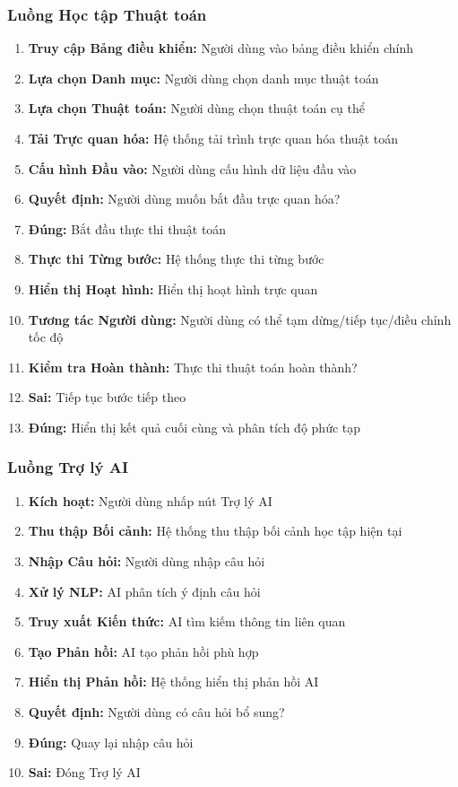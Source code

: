 \subsubsection{Luồng Học tập Thuật toán}
\begin{enumerate}
    \item \textbf{Truy cập Bảng điều khiển:} Người dùng vào bảng điều khiển chính
    \item \textbf{Lựa chọn Danh mục:} Người dùng chọn danh mục thuật toán
    \item \textbf{Lựa chọn Thuật toán:} Người dùng chọn thuật toán cụ thể
    \item \textbf{Tải Trực quan hóa:} Hệ thống tải trình trực quan hóa thuật toán
    \item \textbf{Cấu hình Đầu vào:} Người dùng cấu hình dữ liệu đầu vào
    \item \textbf{Quyết định:} Người dùng muốn bắt đầu trực quan hóa?
    \item \textbf{Đúng:} Bắt đầu thực thi thuật toán
    \item \textbf{Thực thi Từng bước:} Hệ thống thực thi từng bước
    \item \textbf{Hiển thị Hoạt hình:} Hiển thị hoạt hình trực quan
    \item \textbf{Tương tác Người dùng:} Người dùng có thể tạm dừng/tiếp tục/điều chỉnh tốc độ
    \item \textbf{Kiểm tra Hoàn thành:} Thực thi thuật toán hoàn thành?
    \item \textbf{Sai:} Tiếp tục bước tiếp theo
    \item \textbf{Đúng:} Hiển thị kết quả cuối cùng và phân tích độ phức tạp
\end{enumerate}

\subsubsection{Luồng Trợ lý AI}
\begin{enumerate}
    \item \textbf{Kích hoạt:} Người dùng nhấp nút Trợ lý AI
    \item \textbf{Thu thập Bối cảnh:} Hệ thống thu thập bối cảnh học tập hiện tại
    \item \textbf{Nhập Câu hỏi:} Người dùng nhập câu hỏi
    \item \textbf{Xử lý NLP:} AI phân tích ý định câu hỏi
    \item \textbf{Truy xuất Kiến thức:} AI tìm kiếm thông tin liên quan
    \item \textbf{Tạo Phản hồi:} AI tạo phản hồi phù hợp
    \item \textbf{Hiển thị Phản hồi:} Hệ thống hiển thị phản hồi AI
    \item \textbf{Quyết định:} Người dùng có câu hỏi bổ sung?
    \item \textbf{Đúng:} Quay lại nhập câu hỏi
    \item \textbf{Sai:} Đóng Trợ lý AI
\end{enumerate}

